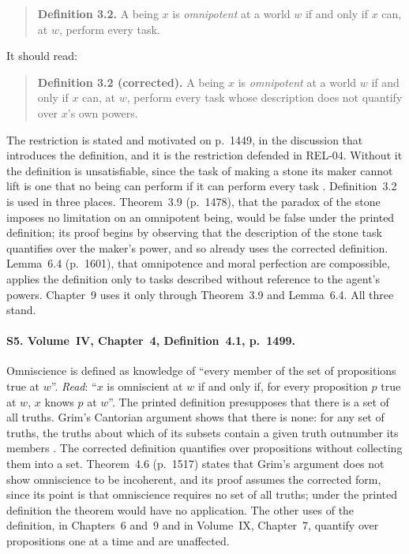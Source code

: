 \documentclass{situationist-preprint}
\begin{document}
\begin{quote}\small
\textbf{Definition 3.2.} A being $x$ is \emph{omnipotent} at a world $w$ if and only if $x$ can, at $w$, perform every task.
\end{quote}

It should read:

\begin{quote}\small
\textbf{Definition 3.2 (corrected).} A being $x$ is \emph{omnipotent} at a world $w$ if and only if $x$ can, at $w$, perform every task whose description does not quantify over $x$'s own powers.
\end{quote}

The restriction is stated and motivated on p.~1449, in the discussion that introduces the definition, and it is the restriction defended in REL-04. Without it the definition is unsatisfiable, since the task of making a stone its maker cannot lift is one that no being can perform if it can perform every task \citep{Mavrodes1963,Savage1967}. Definition~3.2 is used in three places. Theorem~3.9 (p.~1478), that the paradox of the stone imposes no limitation on an omnipotent being, would be false under the printed definition; its proof begins by observing that the description of the stone task quantifies over the maker's power, and so already uses the corrected definition. Lemma~6.4 (p.~1601), that omnipotence and moral perfection are compossible, applies the definition only to tasks described without reference to the agent's powers. Chapter~9 uses it only through Theorem~3.9 and Lemma~6.4. All three stand.

\paragraph{S5. Volume~IV, Chapter~4, Definition~4.1, p.~1499.} Omniscience is defined as knowledge of \enquote{every member of the set of propositions true at $w$}. \textit{Read}: \enquote{$x$ is omniscient at $w$ if and only if, for every proposition $p$ true at $w$, $x$ knows $p$ at $w$}. The printed definition presupposes that there is a set of all truths. Grim's Cantorian argument shows that there is none: for any set of truths, the truths about which of its subsets contain a given truth outnumber its members \citep{Grim1983,Grim1991}. The corrected definition quantifies over propositions without collecting them into a set. Theorem~4.6 (p.~1517) states that Grim's argument does not show omniscience to be incoherent, and its proof assumes the corrected form, since its point is that omniscience requires no set of all truths; under the printed definition the theorem would have no application. The other uses of the definition, in Chapters~6 and~9 and in Volume~IX, Chapter~7, quantify over propositions one at a time and are unaffected.
\end{document}
